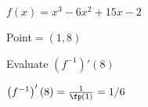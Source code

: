 {$f(x) = x^3-6x^2+15x-2$

Point$=(1,8)$ 

Evaluate $\left(f^{-1}\right)'(8)$}
{$\left(f^{-1}\right)'(8) = \frac{1}{\fp(1)} = 1/6$
}
